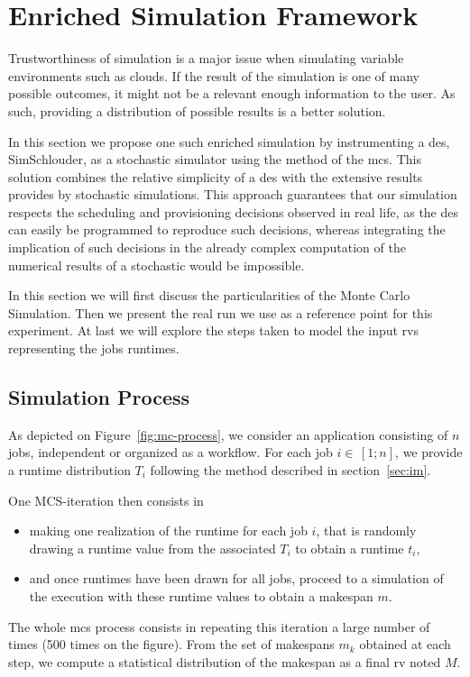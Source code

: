 \documentclass[10pt,conference,compsocconf]{IEEEtran}
\begin{document}
\section{Enriched Simulation Framework}
\label{sec:enriched-sim}

Trustworthiness of simulation is a major issue when simulating variable
environments such as clouds. If the result of the simulation is one of many
possible outcomes, it might not be a relevant enough information to the user. 
As such, providing a distribution of possible results is a better solution.

In this section we propose one such enriched simulation by instrumenting a
\ac{des}, SimSchlouder, as a stochastic simulator using the method of the
\acf{mcs}. This solution combines the relative simplicity of a \ac{des} with the
extensive results provides by stochastic simulations. This approach guarantees
that our simulation respects the scheduling and provisioning decisions observed
in real life, as the \ac{des} can easily be programmed to reproduce such
decisions, whereas integrating the implication of such decisions in the already
complex computation of the numerical results of a stochastic would be
impossible.

In this section we will first discuss the particularities of the Monte Carlo
Simulation. Then we present the real run we use as a reference point for this
experiment. At last we will explore the steps taken to model the
input \acp{rv} representing the jobs runtimes.

\subsection{Simulation Process}
As  depicted   on  Figure~\ref{fig:mc-process},  we  consider   an  application
consisting of  $n$ jobs, independent  or organized as  a workflow. For  each job
$i  \in\,[1;n]$, we provide  a runtime distribution $T_i$ following the method
described in section~\ref{sec:im}.

One MCS-iteration then consists in 
\begin{itemize}
\item making one realization of the runtime  for each job $i$, that is randomly
  drawing a runtime value from the associated $T_i$ to obtain a runtime $t_i$,
\item and once runtimes have been drawn for all jobs, proceed to a simulation
  of the execution with these runtime values to obtain a makespan $m$.
\end{itemize}
The whole \ac{mcs} process  consists in repeating this iteration a  large number
of times (500 times  on the  figure). From the  set of makespans  $m_k$ obtained
at each step, we compute  a statistical distribution of the makespan  as a final
\ac{rv} noted $M$.
\end{document}
